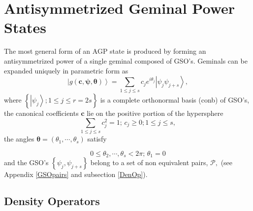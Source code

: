 \documentclass[aps,preprint]{revtex4}%
\begin{document}
\section{Antisymmetrized Geminal Power States\label{AGP States}}

The most general form of an AGP state is produced by forming an
antisymmetrized power of a single geminal composed of GSO's. Geminals can be
expanded uniquely in parametric form as
\begin{equation}
\left\vert g\left(  \boldsymbol{c},\boldsymbol{\psi},\boldsymbol{\theta
}\right)  \right\rangle =\sum_{1\leq j\leq s}c_{j}e^{i\theta_{j}}\left\vert
\psi_{j}\psi_{j+s}\right\rangle ,\label{gem}%
\end{equation}
where $\left\{  \left\vert \psi_{j}\right\rangle ;1\leq j\leq r=2s\right\}  $
is a complete orthonormal basis (conb) of GSO's, the canonical coefficients
$\mathbf{c}$ lie on the positive portion of the hypersphere
\begin{equation}
\sum\limits_{1\leq j\leq s}c_{j}^{2}=1;\,c_{j}\geq0;1\leq j\leq s,
\end{equation}
the angles $\boldsymbol{\theta}=\left(  \theta_{1},\cdots,\theta_{s}\right)  $ satisfy%

\begin{equation}
0\leq\theta_{2},\cdots,\theta_{s}<2\pi;\,\theta_{1}=0 \label{Phases}%
\end{equation}
and the GSO's $\left\{  \psi_{j},\psi_{j+s}\right\}  $ belong to a set of non
equivalent pairs, $\mathcal{P},$ (see Appendix \ref{GSOpairs} and subsection
\ref{DenOp}).

\subsection{Density Operators\label{DenOp}}
\end{document}
